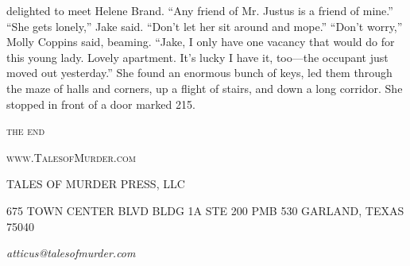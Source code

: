 \documentclass{novel}
\begin{document}
delighted to meet Helene Brand. “Any friend of Mr. Justus is a friend of mine.” “She gets lonely,” Jake said. “Don’t let her sit around and mope.” “Don’t worry,” Molly Coppins said, beaming. “Jake, I only have one vacancy that would do for this young lady. Lovely apartment. It’s lucky I have it, too—the occupant just moved out yesterday.” She found an enormous bunch of keys, led them through the maze of halls and corners, up a flight of stairs, and down a long corridor. She stopped in front of a door marked 215.


\scenebreak
\scenebreak
{\centering\textsc{the end}\par}

\clearpage

\null

\centering\textsc{www.TalesofMurder.com}\par

\vspace*{10\nbs}


TALES OF MURDER PRESS, LLC

\null

\scshape{675 TOWN CENTER BLVD
BLDG 1A STE 200 PMB 530
GARLAND, TEXAS 75040}

\null

\textit{atticus@talesofmurder.com}
\vfill
\end{document}
